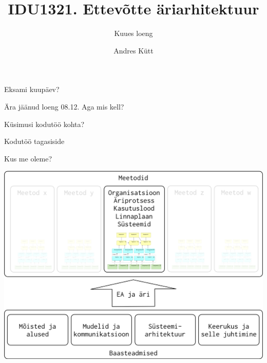 \documentclass{beamer}
\title{IDU1321. Ettevõtte äriarhitektuur}
\subtitle{Kuues loeng}
\author{Andres Kütt}
\institute{Arhitekt}
\begin{document}
\begin{frame}
\titlepage
\end{frame}



\begin{frame}[standout]
Eksami kuupäev?
\end{frame}

\begin{frame}[standout]
Ära jäänud loeng 08.12. Aga mis kell?
\end{frame}

\begin{frame}[standout]
Küsimusi kodutöö kohta?
\end{frame}

\begin{frame}[standout]
Kodutöö tagasiside
\end{frame}


\begin{frame}{Kus me oleme?}
	\begin{center}
		\includegraphics[width=.8\textwidth]{aine_struktuur}
	\end{center}
\end{frame}
\end{document}
